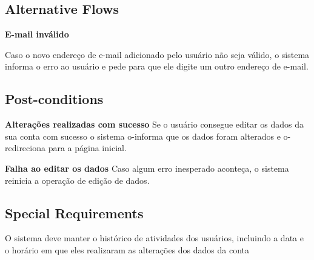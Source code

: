 \subsection*{Alternative Flows}

\textbf{E-mail inválido}

Caso o novo endereço de e-mail adicionado pelo usuário não seja válido, o sistema informa o
erro ao usuário e pede para que ele digite um outro endereço de e-mail.


\subsection*{Post-conditions}

\textbf{Alterações realizadas com sucesso}
Se o usuário consegue editar os dados da sua conta com sucesso o sistema o-informa que os
dados foram alterados e o-redireciona para a página inicial.


\textbf{Falha ao editar os dados}
Caso algum erro inesperado aconteça, o sistema reinicia a operação de edição de dados.

\subsection*{Special Requirements} 
O sistema deve manter o histórico de atividades dos usuários, incluindo a data e o horário em
que eles realizaram as alterações dos dados da conta